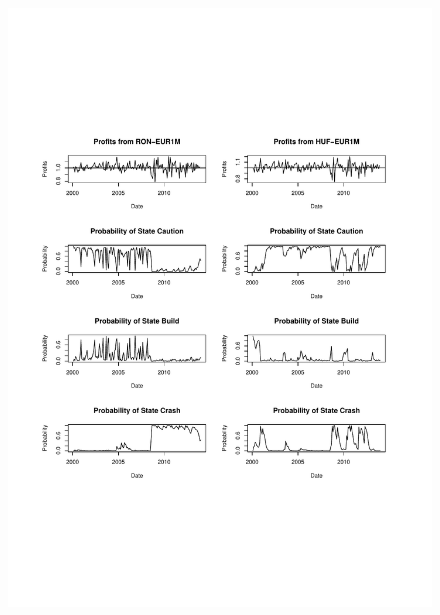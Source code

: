 \documentclass[12pt, a4paper, oneside]{article} %
\begin{document}
\begin{figure}[h!]
\centering
\includegraphics[scale = .80]{../Figures/3RegProb/RONHUFEUR.pdf}
\end{figure}
\end{document}
